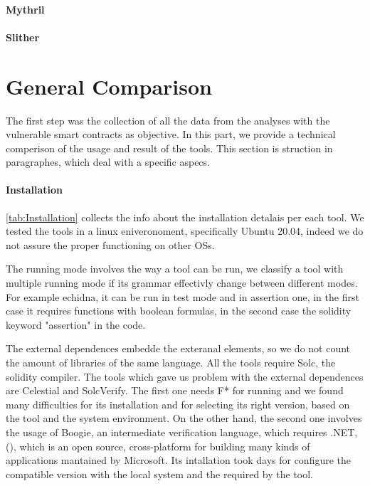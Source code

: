 \paragraph{Mythril}

\paragraph{Slither}



\section{General Comparison}

The first step was the collection of all the data from the analyses with the vulnerable smart contracts as objective. 
In this part, we provide a technical comperison of the usage and result of the tools. 
This section is struction in paragraphes, which deal with a specific aspecs.

\paragraph{Installation} \autoref{tab:Installation} collects the info about the installation detalais per each tool. 
We tested the tools in a linux eniveronoment, specifically Ubuntu 20.04, indeed we do not assure the proper functioning on other OSs.

The running mode involves the way a tool can be run, we classify a tool with multiple running mode if its grammar effectivly change between different modes. For example echidna, it can be run in 
test mode and in assertion one, in the first case it requires functions with boolean formulas, in the second case the solidity keyword "assertion" in the code.

The external dependences embedde the exteranal elements, so we do not count the amount of libraries of the same language. All the tools require Solc, the solidity compiler. 
The tools which gave us problem with the external dependences are Celestial and SolcVerify. The first one needs F* for running and we found many difficulties for its installation and for selecting its right version, 
based on the tool and the system environment. On the other hand, the second one involves the usage of Boogie, an intermediate verification language, which requires .NET, (\cite{NET}), 
which is an open source, cross-platform for building many kinds of applications mantained by Microsoft. 
Its intallation took days for configure the compatible version with the local system and the required by the tool.


